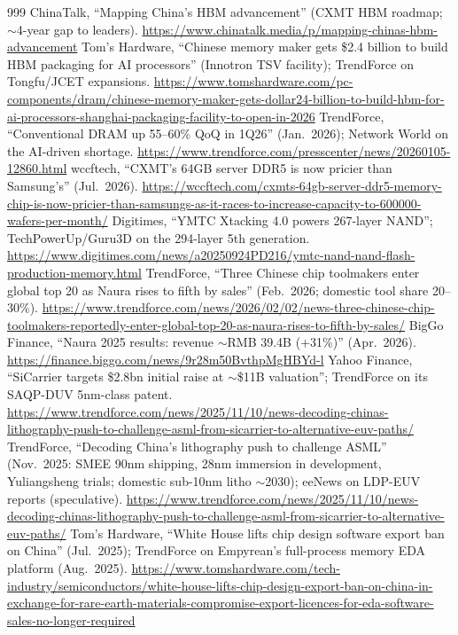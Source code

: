 \begin{thebibliography}{999}
 ChinaTalk, ``Mapping China's HBM advancement'' (CXMT HBM roadmap; $\sim$4-year gap to leaders). \url{https://www.chinatalk.media/p/mapping-chinas-hbm-advancement}
 Tom's Hardware, ``Chinese memory maker gets \$2.4 billion to build HBM packaging for AI processors'' (Innotron TSV facility); TrendForce on Tongfu/JCET expansions. \url{https://www.tomshardware.com/pc-components/dram/chinese-memory-maker-gets-dollar24-billion-to-build-hbm-for-ai-processors-shanghai-packaging-facility-to-open-in-2026}
 TrendForce, ``Conventional DRAM up 55--60\% QoQ in 1Q26'' (Jan.\ 2026); Network World on the AI-driven shortage. \url{https://www.trendforce.com/presscenter/news/20260105-12860.html}
 wccftech, ``CXMT's 64GB server DDR5 is now pricier than Samsung's'' (Jul.\ 2026). \url{https://wccftech.com/cxmts-64gb-server-ddr5-memory-chip-is-now-pricier-than-samsungs-as-it-races-to-increase-capacity-to-600000-wafers-per-month/}
 Digitimes, ``YMTC Xtacking 4.0 powers 267-layer NAND''; TechPowerUp/Guru3D on the 294-layer 5th generation. \url{https://www.digitimes.com/news/a20250924PD216/ymtc-nand-nand-flash-production-memory.html}
 TrendForce, ``Three Chinese chip toolmakers enter global top 20 as Naura rises to fifth by sales'' (Feb.\ 2026; domestic tool share 20--30\%). \url{https://www.trendforce.com/news/2026/02/02/news-three-chinese-chip-toolmakers-reportedly-enter-global-top-20-as-naura-rises-to-fifth-by-sales/}
 BigGo Finance, ``Naura 2025 results: revenue $\sim$RMB 39.4B (+31\%)'' (Apr.\ 2026). \url{https://finance.biggo.com/news/9r28m50BvthpMgHBYd-l}
 Yahoo Finance, ``SiCarrier targets \$2.8bn initial raise at $\sim$\$11B valuation''; TrendForce on its SAQP-DUV 5nm-class patent. \url{https://www.trendforce.com/news/2025/11/10/news-decoding-chinas-lithography-push-to-challenge-asml-from-sicarrier-to-alternative-euv-paths/}
 TrendForce, ``Decoding China's lithography push to challenge ASML'' (Nov.\ 2025: SMEE 90nm shipping, 28nm immersion in development, Yuliangsheng trials; domestic sub-10nm litho $\sim$2030); eeNews on LDP-EUV reports (speculative). \url{https://www.trendforce.com/news/2025/11/10/news-decoding-chinas-lithography-push-to-challenge-asml-from-sicarrier-to-alternative-euv-paths/}
 Tom's Hardware, ``White House lifts chip design software export ban on China'' (Jul.\ 2025); TrendForce on Empyrean's full-process memory EDA platform (Aug.\ 2025). \url{https://www.tomshardware.com/tech-industry/semiconductors/white-house-lifts-chip-design-export-ban-on-china-in-exchange-for-rare-earth-materials-compromise-export-licences-for-eda-software-sales-no-longer-required}

\end{thebibliography}
